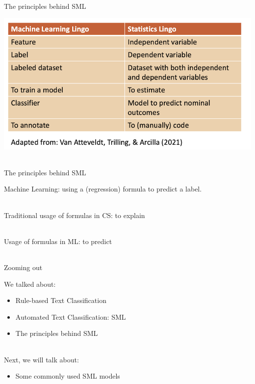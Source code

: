 \documentclass[handout]{beamer}
\begin{document}
	
	\begin{frame}{The principles behind SML}
		
		\begin{center}
			\includegraphics[width=\linewidth,height=\textheight,keepaspectratio]{../pictures/MLlingo.png} \\\
		\end{center}
		
		
		
	\end{frame}
	
	
	\begin{frame}{The principles behind SML} 
		
		Machine Learning: using a (regression) formula to predict a label. \\\
		
		Traditional usage of formulas in CS: to explain \\\
		
		Usage of formulas in ML: to predict \\\
		
		
		
		
	\end{frame}
	
	
	
	\begin{frame}{Zooming out} 
		
		We talked about:
		\begin{itemize}
			\item Rule-based Text Classification
			\item Automated Text Classification: SML
			\item The principles behind SML \\\
		\end{itemize}
		
		Next, we will talk about:
		\begin{itemize}
			\item Some commonly used SML models
		\end{itemize}
		
	\end{frame}
	
\end{document}
